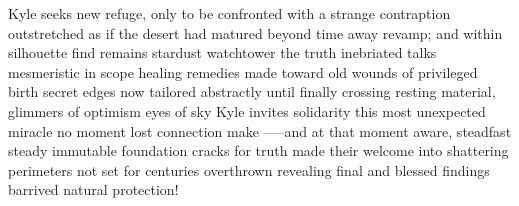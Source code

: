 Kyle seeks new refuge, only to be confronted with a strange contraption outstretched as if the desert had matured beyond time away revamp; and within silhouette find remains stardust watchtower the truth inebriated talks mesmeristic in scope healing remedies made toward old wounds of privileged birth secret edges now tailored abstractly until finally crossing resting material, glimmers of optimism eyes of sky Kyle invites solidarity this most unexpected miracle no moment lost connection make -----and at that moment aware, steadfast steady immutable foundation cracks for truth made their welcome into shattering perimeters not set for centuries overthrown revealing final and blessed findings barrived natural protection!